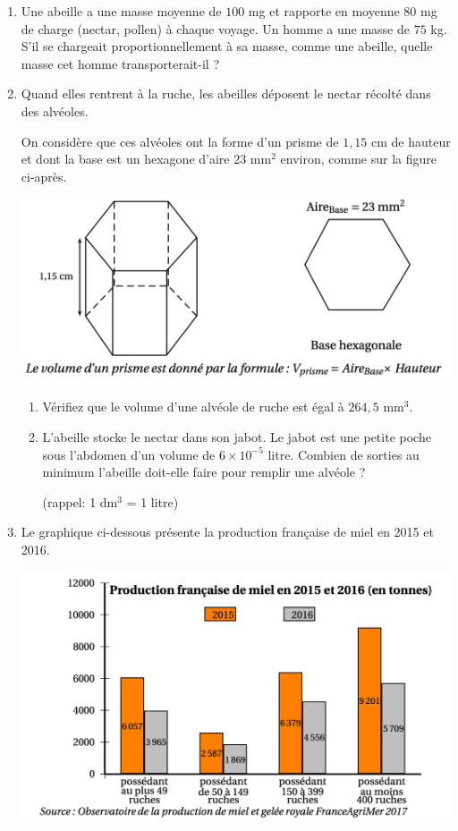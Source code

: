 \documentclass[11pt]{article}
\begin{document}
\begin{enumerate}

\item Une abeille a une masse moyenne de $100$ mg et rapporte en moyenne 
$80$ mg de charge (nectar, pollen) à chaque voyage. 
Un homme a une masse de $75$ kg. S'il se chargeait proportionnellement à sa masse, comme une abeille, quelle masse cet homme transporterait-il ? 
\item Quand elles rentrent à la ruche, les abeilles déposent le nectar récolté dans des alvéoles. 

On considère que ces alvéoles ont la forme d'un prisme de $1,15$ cm de hauteur et dont la base est un hexagone d'aire $23$ mm${}^2$ environ, comme sur la figure ci-après. 


\begin{center}\includegraphics[width = 12 cm]{Exo61}
\end{center}
\begin{enumerate}
\item Vérifiez que le volume d'une alvéole de ruche est égal à $264,5$ mm${}^3$.

		\item L'abeille stocke le nectar dans son jabot. Le jabot est une petite poche sous l'abdomen d'un volume de $6 \times  10^{-5}$ litre. Combien de sorties au minimum l'abeille doit-elle faire pour remplir une alvéole ?

(rappel: 1 dm$^3$ = 1 litre) 
\end{enumerate}
\item Le graphique ci-dessous présente la production française de miel en 2015 et 2016.

\begin{center}\includegraphics[width = 12 cm]{Exo62}
\end{center}


\end{enumerate}
\end{document}
